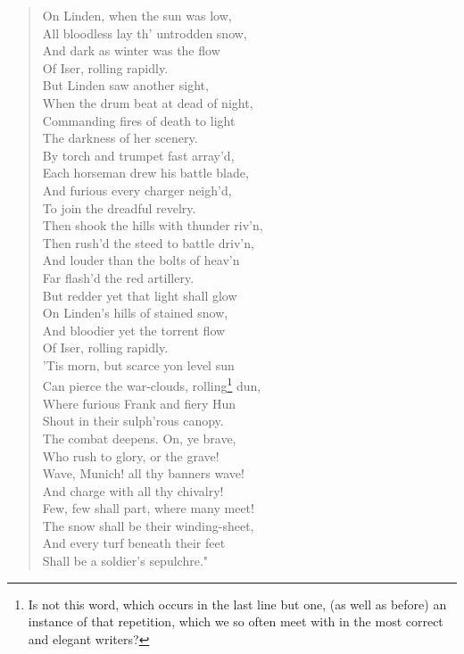 \begin{verse}
  On Linden, when the sun was low,\\
  All bloodless lay th' untrodden snow,\\
  And dark as winter was the flow\\
  Of Iser, rolling rapidly.\\[\stanzaskip]

  But Linden saw another sight,\\
  When the drum beat at dead of night,\\
  Commanding fires of death to light\\
  The darkness of her scenery.\\[\stanzaskip]

  By torch and trumpet fast array'd,\\
  Each horseman drew his battle blade,\\
  And furious every charger neigh'd,\\
  To join the dreadful revelry.\\[\stanzaskip]

  Then shook the hills with thunder riv'n,\\
  Then rush'd the steed to battle driv'n,\\
  And louder than the bolts of heav'n\\
  Far flash'd the red artillery.\\[\stanzaskip]

  But redder yet that light shall glow\\
  On Linden's hills of stained snow,\\
  And bloodier yet the torrent flow\\
  Of Iser, rolling rapidly.\\[\stanzaskip]

  'Tis morn, but scarce yon level sun\\
  Can pierce the war-clouds, rolling\footnote{Is not this word, which occurs in the last line but one,
(as well as before) an instance of that repetition, which we so often
meet with in the most correct and elegant writers?} dun,\\
  Where furious Frank and fiery Hun\\
  Shout in their sulph'rous canopy.\\[\stanzaskip]

  The combat deepens.  On, ye brave,\\
  Who rush to glory, or the grave!\\
  Wave, Munich! all thy banners wave!\\
  And charge with all thy chivalry!\\[\stanzaskip]

  Few, few shall part, where many meet!\\
  The snow shall be their winding-sheet,\\
  And every turf beneath their feet\\
  Shall be a soldier's sepulchre."\\
\end{verse}
